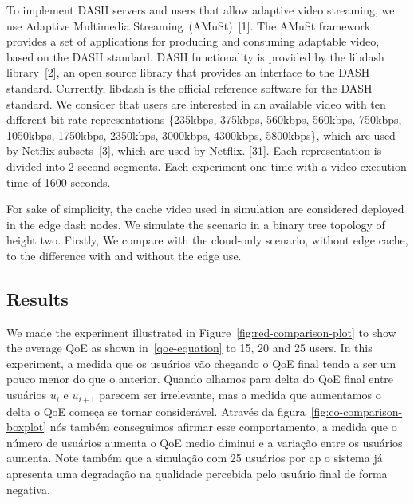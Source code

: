 To implement DASH servers and users that allow adaptive video streaming, we use Adaptive Multimedia Streaming~(AMuSt)~[1]. The AMuSt framework provides a set of applications for producing and consuming adaptable video, based on the DASH standard. DASH functionality is provided by the libdash library~[2], an open source library that provides an interface to the DASH standard. Currently, libdash is the official reference software for the DASH standard. We consider that users are interested in an available video with ten different bit rate representations \{235kbps, 375kbps, 560kbps, 560kbps, 750kbps, 1050kbps, 1750kbps, 2350kbps, 3000kbps, 4300kbps, 5800kbps\}, which are used by Netflix subsets~[3], which are used by Netflix. [31]. Each representation is divided into 2-second segments. Each experiment one time with a video execution time of 1600 seconds. %


For sake of simplicity, the cache video used in simulation are considered deployed in the edge dash nodes.
We simulate the scenario in a binary tree topology of height two.  Firstly, We compare with the cloud-only scenario, without edge cache, to the difference with and without the edge use.




\subsection{Results}

We made the experiment illustrated in Figure~\ref{fig:red-comparison-plot} to show the average QoE as shown in~\ref{qoe-equation} to 15, 20 and 25 users. In this experiment, a medida que os usuários vão chegando o QoE final tenda a ser um pouco menor do que o anterior. Quando olhamos para delta do QoE final entre usuários $u_{i}$ e $u_{i+1}$ parecem ser irrelevante, mas a medida que aumentamos o delta o QoE começa se tornar considerável. Através da figura~\ref{fig:co-comparison-boxplot} nós também conseguimos afirmar esse comportamento, a medida que o número de usuários aumenta o QoE medio diminui e a variação entre os usuários aumenta. Note também que a simulação com 25 usuários por ap o sistema já apresenta uma degradação na qualidade percebida pelo usuário final de forma negativa.

